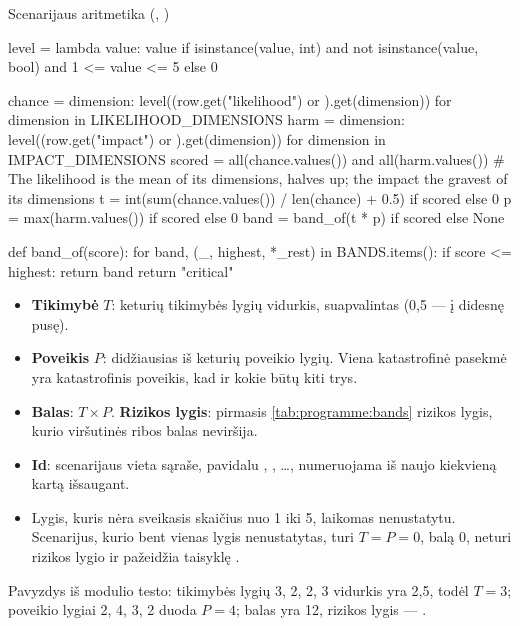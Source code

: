 \begin{codebox}{Scenarijaus aritmetika (, )}
\begin{codeblock}
level = lambda value: value if isinstance(value, int) and not isinstance(value, bool) and 1 <= value <= 5 else 0

chance = {dimension: level((row.get("likelihood") or {}).get(dimension)) for dimension in LIKELIHOOD_DIMENSIONS}
harm = {dimension: level((row.get("impact") or {}).get(dimension)) for dimension in IMPACT_DIMENSIONS}
scored = all(chance.values()) and all(harm.values())
# The likelihood is the mean of its dimensions, halves up; the impact the gravest of its dimensions
t = int(sum(chance.values()) / len(chance) + 0.5) if scored else 0
p = max(harm.values()) if scored else 0
band = band_of(t * p) if scored else None
\end{codeblock}

\begin{codeblock}
def band_of(score):
    for band, (_, highest, *_rest) in BANDS.items():
        if score <= highest:
            return band
    return "critical"
\end{codeblock}

\begin{itemize}
  \item \textbf{Tikimybė} $T$: keturių tikimybės lygių vidurkis, suapvalintas (0,5 ---
        į didesnę pusę).
  \item \textbf{Poveikis} $P$: didžiausias iš keturių poveikio lygių. Viena katastrofinė
        pasekmė yra katastrofinis poveikis, kad ir kokie būtų kiti trys.
  \item \textbf{Balas}: $T \times P$. \textbf{Rizikos lygis}: pirmasis
        \cref{tab:programme:bands} rizikos lygis, kurio viršutinės ribos balas neviršija.
  \item \textbf{Id}: scenarijaus vieta sąraše, pavidalu , , …,
        numeruojama iš naujo kiekvieną kartą išsaugant.
  \item Lygis, kuris nėra sveikasis skaičius nuo 1 iki 5, laikomas nenustatytu. Scenarijus,
        kurio bent vienas lygis nenustatytas, turi $T = P = 0$, balą 0, neturi rizikos lygio
        ir pažeidžia taisyklę .
\end{itemize}

Pavyzdys iš modulio testo: tikimybės lygių 3, 2, 2, 3 vidurkis yra 2,5, todėl $T = 3$;
poveikio lygiai 2, 4, 3, 2 duoda $P = 4$; balas yra 12, rizikos lygis --- .
\end{codebox}

